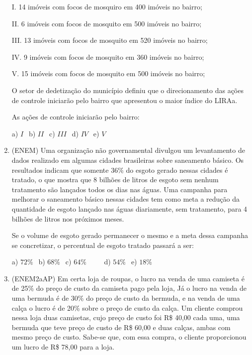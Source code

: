 \begin{multicols*}{2}
\begin{enumerate}
              I. 14 imóveis com focos de mosquiro em 400 imóveis no bairro;

              II. 6 imóveis com focos de mosquito em 500 imóveis no bairro;

              III. 13 imóveis com focos de mosquito em 520 imóveis no bairro;

              IV. 9 imóveis com focos de mosquito em 360 imóveis no bairro;

              V. 15 imóveis com focos de mosquito em 500 imóveis no bairro;

              O setor de dedetização do município definiu que o direcionamento das ações de controle iniciarão pelo bairro
              que apresentou o maior índice do LIRAa.

              As ações de controle iniciarão pelo bairro:

              a) $ I \ \ $ b) $ II \ \ $ c) $III \ \ $ d) $ IV \ \ $ e) $ V \ \ $

        \item (ENEM) Uma organização não governamental divulgou um levantamento de dados realizado em algumas cidades
              brasileiras sobre saneamento básico. Os resultados indicam que somente 36\% do esgoto gerado nessas cidades é tratado, o que mostra que 8 bilhões de litros de esgoto sem nenhum tratamento são lançados todos os dias nas águas. Uma campanha para melhorar o saneamento básico nessas cidades tem como meta a redução da quantidade de esgoto lançado nas águas diariamente, sem tratamento, para 4 bilhões de litros nos próximos meses.

              Se o volume de esgoto gerado permanecer o mesmo e a meta dessa campanha se concretizar, o percentual de esgoto tratado passará a ser:

              a) $72\% \ \ $ b) $68\% \ \ $ c) $64\% \ \ \ \ \ \ \ \ \ \ $ d) $54\% \ \ $ e) $18\% \ \ $

        \item (ENEM2aAP) Em certa loja de roupas, o lucro na venda de uma camiseta é de 25\% do preço de custo da camiseta pago pela loja, Já o lucro na venda de uma bermuda é de 30\% do preço de custo da bermuda, e na venda de uma calça o lucro é de 20\% sobre o preço de custo da calça. Um cliente comprou nessa loja duas camisetas, cujo preço de custo foi R\$ 40,00 cada uma, uma bermuda que teve preço de custo de R\$ 60,00 e duas calças, ambas com mesmo
              preço de custo. Sabe-se que, com essa compra, o cliente proporcionou um lucro de R\$ 78,00 para a loja.


\end{enumerate}
\end{multicols*}

